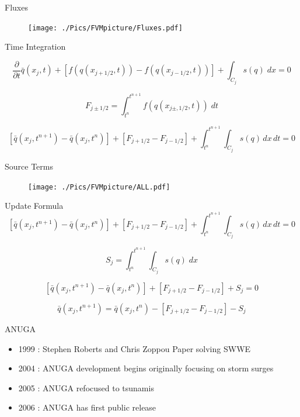 \documentclass[pdf]{beamer}
\begin{document}
\begin{frame}{Fluxes}
	\begin{figure}
		\texttt{[image: ./Pics/FVMpicture/Fluxes.pdf]}
	\end{figure}
\end{frame}
\begin{frame}{Time Integration}
	
	\begin{equation*}
	\frac{\partial}{\partial t} \bar{q}(x_j,t) + \left[f(q(x_{j+1/2},t)) - f(q(x_{j-1/2},t))  \right] + \int_{C_j} s(q) \; dx  = 0
	\end{equation*}
	
	\begin{equation}
	F_{j \pm 1/2} = \int_{t^n}^{t^{n+1}} f(q(x_{j\pm,1/2},t)) \; dt
	\end{equation}
  
	\begin{equation}
	\left[\bar{q}(x_j,t^{n+1}) - \bar{q}(x_j,t^n)\right]+ \left[F_{j + 1/2} - F_{j - 1/2} \right] +  \int_{t^n}^{t^{n+1}} \int_{C_j} s(q) \, dx \, dt = 0
	\end{equation}
\end{frame}
\begin{frame}{Source Terms}
	\begin{figure}
		\texttt{[image: ./Pics/FVMpicture/ALL.pdf]}
	\end{figure}
\end{frame}
\begin{frame}{Update Formula}
	\begin{equation}
	\left[\bar{q}(x_j,t^{n+1}) - \bar{q}(x_j,t^n)\right]+ \left[F_{j + 1/2} - F_{j - 1/2} \right] +  \int_{t^n}^{t^{n+1}} \int_{C_j} s(q) \, dx \, dt   = 0
	\end{equation}
	
	\begin{equation}
	S_{j} = \int_{t^n}^{t^{n+1}} \int_{C_j} s(q) \; dx
	\end{equation}
	
	\begin{equation}
	\left[\bar{q}(x_j,t^{n+1}) - \bar{q}(x_j,t^n)\right]+ \left[F_{j + 1/2} - F_{j - 1/2} \right] +  S_j  = 0
	\end{equation}
	
		\begin{equation}
		\bar{q}(x_j,t^{n+1})  = \bar{q}(x_j,t^n) -  \left[F_{j + 1/2} - F_{j - 1/2} \right] -  S_j
		\end{equation}
	
	
\end{frame}
\begin{frame}{ANUGA}
	\begin{itemize}
		\item 1999 : Stephen Roberts and Chris Zoppou Paper solving SWWE
		\item 2004 : ANUGA development begins originally focusing on storm surges
		\item 2005 : ANUGA refocused to tsunamis
		\item 2006 : ANUGA has first public release
	\end{itemize}
\end{frame}
\end{document}
